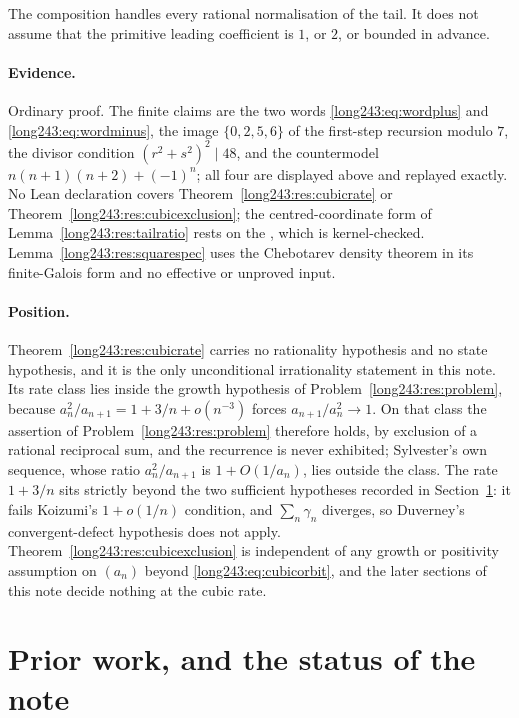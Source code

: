 The composition handles every rational normalisation of the tail.  It does not
assume that the primitive leading coefficient is $1$, or $2$, or bounded in
advance.

\paragraph{Evidence.}
Ordinary proof.  The finite claims are the two words \eqref{long243:eq:wordplus}
and \eqref{long243:eq:wordminus}, the image $\{0,2,5,6\}$ of the first-step recursion
modulo $7$, the divisor condition $(r^2+s^2)^2\mid48$, and the countermodel
$n(n+1)(n+2)+(-1)^n$; all four are displayed above and replayed exactly.  No Lean
declaration covers Theorem~\ref{long243:res:cubicrate} or
Theorem~\ref{long243:res:cubicexclusion}; the centred-coordinate form of
Lemma~\ref{long243:res:tailratio} rests on the
, which is kernel-checked.  Lemma~\ref{long243:res:squarespec} uses the
Chebotarev density theorem in its finite-Galois form and no effective or
unproved input.

\paragraph{Position.}
Theorem~\ref{long243:res:cubicrate} carries no rationality hypothesis and no state
hypothesis, and it is the only unconditional irrationality statement in this
note.  Its rate class lies inside the growth hypothesis of
Problem~\ref{long243:res:problem}, because $a_n^2/a_{n+1}=1+3/n+o(n^{-3})$ forces
$a_{n+1}/a_n^2\to1$.  On that class the assertion of Problem~\ref{long243:res:problem}
therefore holds, by exclusion of a rational reciprocal sum, and the recurrence
is never exhibited; Sylvester's own sequence, whose ratio $a_n^2/a_{n+1}$ is
$1+O(1/a_n)$, lies outside the class.  The rate $1+3/n$ sits strictly beyond
the two sufficient hypotheses recorded in Section~\ref{long243:sec:priorwork}: it fails
Koizumi's $1+o(1/n)$ condition, and $\sum_n\gamma_n$ diverges, so Duverney's
convergent-defect hypothesis does not apply.  Theorem~\ref{long243:res:cubicexclusion}
is independent of any growth or positivity assumption on $(a_n)$ beyond
\eqref{long243:eq:cubicorbit}, and the later sections of this note decide nothing at
the cubic rate.

\section{Prior work, and the status of the note}\label{long243:sec:priorwork}

